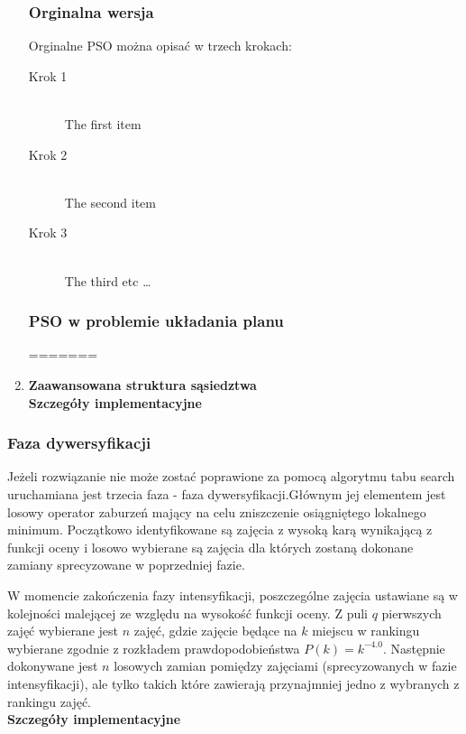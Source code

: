\documentclass[11pt]{report}
\begin{document}
\begin{enumerate}
\subsubsection{Orginalna wersja}
\par Orginalne PSO można opisać w trzech krokach:

\begin{description}
  \item[Krok 1] \hfill \\
  The first item
  \item[Krok 2] \hfill \\
  The second item
  \item[Krok 3] \hfill \\
  The third etc \ldots
\end{description}

\subsubsection{PSO w problemie układania planu}
=======
\item \textbf{Zaawansowana struktura sąsiedztwa} \\
\textbf{Szczegóły implementacyjne}
\end{enumerate}

\subsubsection{Faza dywersyfikacji}
\par Jeżeli rozwiązanie nie może zostać poprawione za pomocą algorytmu tabu search uruchamiana jest trzecia faza - faza dywersyfikacji.Głównym jej elementem jest losowy operator zaburzeń mający na celu zniszczenie osiągniętego lokalnego minimum. Początkowo identyfikowane są zajęcia z wysoką karą wynikającą z funkcji oceny  i losowo wybierane są zajęcia dla których zostaną dokonane zamiany sprecyzowane w poprzedniej fazie.
\par W momencie zakończenia fazy intensyfikacji, poszczególne zajęcia ustawiane są w kolejności malejącej ze względu na wysokość funkcji oceny. Z puli $q$ pierwszych zajęć wybierane jest $n$ zajęć, gdzie zajęcie będące na $k$ miejscu w rankingu wybierane zgodnie z rozkładem prawdopodobieństwa $P(k) = k^{-4.0}$. Następnie dokonywane jest $n$ losowych zamian pomiędzy zajęciami (sprecyzowanych w fazie intensyfikacji), ale tylko takich które zawierają przynajmniej jedno z wybranych z rankingu zajęć. \\
\textbf{Szczegóły implementacyjne}
\end{document}
